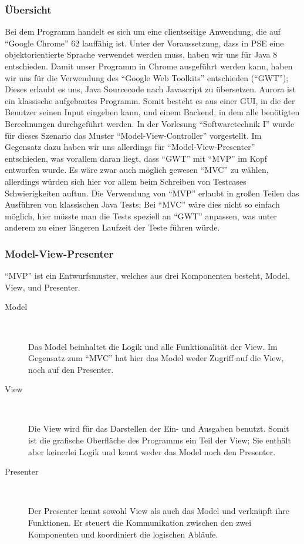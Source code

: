 \documentclass[parskip=full,11pt,twoside]{scrbook}
\begin{document}
\subsubsection{Übersicht}
Bei dem Programm handelt es sich um eine clientseitige Anwendung, die auf \enquote{Google Chrome} 62 lauffähig ist.
Unter der Voraussetzung, dass in PSE eine objektorientierte Sprache verwendet werden muss, haben wir uns für Java 8 entschieden.
Damit unser Programm in Chrome ausgeführt werden kann, haben wir uns für die Verwendung des \enquote{Google Web Toolkits} entschieden (\enquote{GWT});
Dieses erlaubt es uns, Java Sourcecode nach Javascript zu übersetzen.
\newline
Aurora ist ein klassische aufgebautes Programm.
Somit besteht es aus einer GUI, in die der Benutzer seinen Input eingeben kann, und einem Backend, in dem alle benötigten Berechnungen durchgeführt werden. 
In der Vorlesung \enquote{Softwaretechnik I} wurde für dieses Szenario das Muster \enquote{Model-View-Controller} vorgestellt.
Im Gegensatz dazu haben wir uns allerdings für \enquote{Model-View-Presenter} entschieden, was vorallem daran liegt, dass \enquote{GWT} mit \enquote{MVP} im Kopf entworfen wurde.
Es wäre  zwar auch möglich gewesen \enquote{MVC} zu wählen, allerdings würden sich hier vor allem beim Schreiben von Testcases Schwierigkeiten auftun.
Die Verwendung von \enquote{MVP} erlaubt in großen Teilen das Ausführen von klassischen Java Tests;
Bei \enquote{MVC} wäre dies nicht so einfach möglich, hier müsste man die Tests speziell an \enquote{GWT} anpassen, was unter anderem zu einer längeren Laufzeit der Teste führen würde.

\subsubsection{Model-View-Presenter}
\enquote{MVP} ist ein Entwurfsmuster, welches aus drei Komponenten besteht, Model, View, und Presenter.
\begin{description}
	\item[Model] ~\par
	Das Model beinhaltet die Logik und alle Funktionalität der View.
    Im Gegensatz zum \enquote{MVC} hat hier das Model weder Zugriff auf die View, noch auf den Presenter.

	\item[View] ~\par
	Die View wird für das Darstellen der Ein- und Ausgaben benutzt.
    Somit ist die grafische Oberfläche des Programms ein Teil der View;
    Sie enthält aber keinerlei Logik und kennt weder das Model noch den Presenter.
	
	\item[Presenter] ~\par
	Der Presenter kennt sowohl View als auch das Model und verknüpft ihre Funktionen.
    Er steuert die Kommunikation zwischen den zwei Komponenten und koordiniert die logischen Abläufe.
\end{description}
\end{document}
